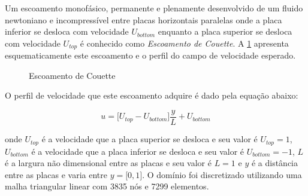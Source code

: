 Um escoamento monofásico, permanente e plenamente desenvolvido
de um fluido newtoniano e incompressível 
entre placas horizontais paralelas onde a placa inferior se desloca com velocidade \textit{$U_{bottom}$}
enquanto a placa superior se desloca com velocidade \textit{$U_{top}$} é 
conhecido como \textit{Escoamento de Couette}.
A \ref{couette} apresenta esquematicamente este escoamento e
o perfil do campo de velocidade esperado.

\begin{figure}[H]
\begin{center}
\end{center}
\caption{Escoamento de Couette}
\label{couette}
\end{figure}


\noindent
O perfil de velocidade que este escoamento adquire 
é dado pela equação abaixo:

\begin{equation}
 u = \big[ U_{top} - U_{bottom} \big] \frac{y}{L} + U_{bottom}
\end{equation}

\medskip
\noindent
onde $U_{top}$ é a velocidade que a placa superior se desloca e seu valor é
$U_{top} = 1$, 
$U_{bottom}$ é a velocidade que a placa inferior se desloca e seu valor é
$U_{bottom} = -1$, 
$L$ é a largura não dimensional
entre as placas e seu valor é $L = 1$
e $y$ é a distância entre as placas e varia entre $y = \big[ 0,1 \big]$.
O domínio foi discretizado utilizando uma malha 
triangular linear com 3835 nós e 7299 elementos. 

